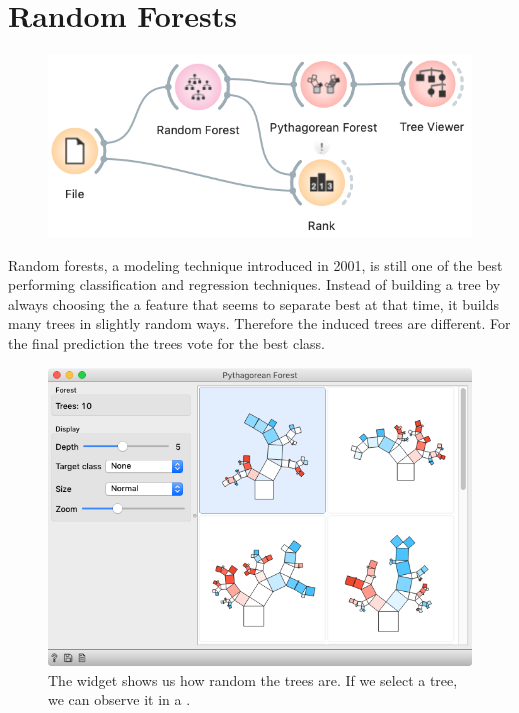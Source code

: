 \chapter{Random Forests}
\label{ch:random_forests}

\begin{figure}
    \vspace{-0.5cm}
    \includegraphics[scale=0.4]{workflow.png}
\end{figure}

Random forests, a modeling technique introduced in 2001, is still one of the best performing classification and regression techniques. Instead of building a tree by always choosing the a feature that seems to separate best at that time, it builds many trees in slightly random ways. Therefore the induced trees are different. For the final prediction the trees vote for the best class.

\begin{figure}[h]
    \centering
    \includegraphics[scale=0.35]{pythagorean.png}
    \caption{The  widget shows us how random the trees are. If we select a tree, we can observe it in a .}
\end{figure}

